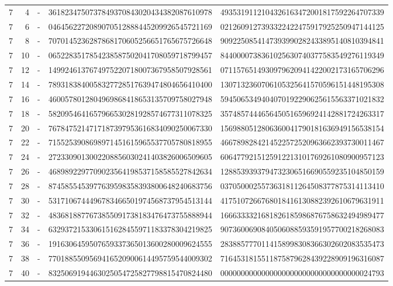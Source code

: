 \begin{longtable}{rrrll}
7 & 4 & - & 3618234750737849370843020434382087610978 & 4935319112104326163472001817592264707339 \\
7 & 6 & - & 0464562272089070512888445209926545721169 & 0212609127393322422475917925250947144125 \\
7 & 8 & - & 7070145236287868170605256651765675726648 & 9092250854147393990282433895140810394841 \\
7 & 10 & - & 0652283517854238587502041708059718799457 & 8440000738361025630740377583549276119349 \\
7 & 12 & - & 1499246137674975220718007367958507928561 & 0711576514930979620941422002173165706296 \\
7 & 14 & - & 7893183840058327728517639474804656410400 & 1307132360706105325641570596151448195308 \\
7 & 16 & - & 4600578012804969868418653135709758027948 & 5945065349404070192290625615563371021832 \\
7 & 18 & - & 5820954641657966530281928574677311078325 & 3574857444656450516596924142881724263317 \\
7 & 20 & - & 7678475214717187397953616834090250067330 & 1569880512806360041790181636949156538154 \\
7 & 22 & - & 7155253908698971451615965537705780818955 & 4667898284214522572520963662393730011467 \\
7 & 24 & - & 2723309013002208856030241403826006509605 & 6064779215125912213101769261080900957123 \\
7 & 26 & - & 4689892297709023564198537158585527842634 & 1288539393794732306516690559235104850159 \\
7 & 28 & - & 8745855453977639598358393800648240683756 & 0370500025573631811264508377875314113410 \\
7 & 30 & - & 5317106744496783466501974568737954513144 & 4175107266768018416130882392610679631911 \\
7 & 32 & - & 4836818877673855091738183476473755888944 & 1666333321681826185986876758632494989477 \\
7 & 34 & - & 6329372153306151628455971183378304219825 & 9073600690840506088593591957700218268083 \\
7 & 36 & - & 1916306459507659337365013600280009624555 & 2838857770114158998308366302602083535473 \\
7 & 38 & - & 7701885509569416520900614495759544009302 & 7164531815511875879628439228909196316087 \\
7 & 40 & - & 8325069194463025054725827798815470824480 & 0000000000000000000000000000000000024793 \\

\end{longtable}
